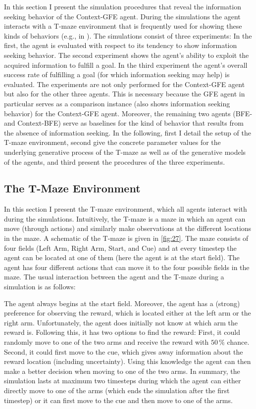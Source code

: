 In this section I present the simulation procedures that reveal the information seeking behavior of the Context-GFE agent. During the simulations the agent interacts with a T-maze environment that is frequently used for showing these kinds of behaviors (e.g., in \textcite{friston2015}). The simulations consist of three experiments: In the first, the agent is evaluated with respect to its tendency to show information seeking behavior. The second experiment shows the agent's ability to exploit the acquired information to fulfill a goal. In the third experiment the agent's overall success rate of fulfilling a goal (for which information seeking may help) is evaluated.
The experiments are not only performed for the Context-GFE agent but also for the other three agents. This is necessary because the GFE agent in particular serves as a comparison instance (also shows information seeking behavior) for the Context-GFE agent. Moreover, the remaining two agents (BFE- and Context-BFE) serve as baselines for the kind of behavior that results from the absence of information seeking.
In the following, first I detail the setup of the T-maze environment, second give the concrete parameter values for the underlying generative process of the T-maze as well as of the generative models of the agents, and third present the procedures of the three experiments.

\subsection{The T-Maze Environment}

In this section I present the T-maze environment, which all agents interact with during the simulations. Intuitively, the T-maze is a maze in which an agent can move (through actions) and similarly make observations at the different locations in the maze. A schematic of the T-maze is given in \cref{fig:27}. The maze consists of four fields (Left Arm, Right Arm, Start, and Cue) and at every timestep the agent can be located at one of them (here the agent is at the start field). The agent has four different actions that can move it to the four possible fields in the maze. The usual interaction between the agent and the T-maze during a simulation is as follows:

The agent always begins at the start field. Moreover, the agent has a (strong) preference for observing the reward, which is located either at the left arm or the right arm. Unfortunately, the agent does initially not know at which arm the reward is. Following this, it has two options to find the reward: First, it could randomly move to one of the two arms and receive the reward with \(50\,\%\) chance. Second, it could first move to the cue, which gives away information about the reward location (including uncertainty). Using this knowledge the agent can then make a better decision when moving to one of the two arms. In summary, the simulation lasts at maximum two timesteps during which the agent can either directly move to one of the arms (which ends the simulation after the first timestep) or it can first move to the cue and then move to one of the arms.

